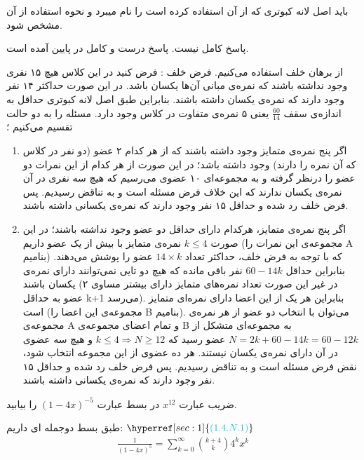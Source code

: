 \documentclass[11pt,largemargins]{h2wp}
\begin{document}
\Nnote
باید اصل لانه   کبوتری که از آن استفاده کرده است را نام میبرد و نحوه استفاده از آن مشخص شود.
\label{sec:2} 

\Tnote
پاسخ کامل نیست. پاسخ درست و کامل در پایین آمده است.
\label{sec:3}



از برهان خلف استفاده می‌کنیم. فرض خلف : فرض کنید در این کلاس هیچ ۱۵ نفری وجود نداشته باشند که نمره‌ی مبانی آن‌ها یکسان باشد.
در این صورت حداکثر ۱۴ نفر وجود دارند که نمره‌ی یکسان داشته باشند. بنابراین  طبق اصل لانه کبوتری حداقل به اندازه‌ی سقف
$\frac{60}{14}$
یعنی ۵ نمره‌ی متفاوت در کلاس وجود دارد. مسئله را به دو حالت تقسیم می‌کنیم ؛
\begin{enumerate}
    \item 
    اگر پنج نمره‌ی متمایز وجود داشته باشند که از هر کدام ۲ عضو
    (دو نفر در کلاس که آن نمره را دارند)
    وجود داشته باشد؛ در این صورت از هر کدام از این نمرات دو عضو را درنظر گرفته و به مجموعه‌ای ۱۰ عضوی
    می‌رسیم که هیچ سه نفری در آن نمره‌ی یکسان ندارند که این خلاف فرض مسئله است و به تناقض رسیدیم.
    پس فرض خلف رد شده و حداقل ۱۵ نفر وجود دارند که نمره‌ی یکسانی داشته باشند.
    
    \item 
    اگر پنج نمره‌ی متمایز، هرکدام دارای حداقل دو عضو وجود نداشته باشند؛
    در این صورت 
    $k \le 4$
    نمره‌ی متمایز با بیش از یک عضو داریم
    (مجموعه‌ی این نمرات را A بنامیم)
    که با توجه به فرض خلف، حداکثر تعداد
    $14 \times k$
    عضو را پوشش می‌دهند. بنابراین حداقل 
    $60 - 14k$
    نفر باقی مانده که هیچ دو تایی نمی‌توانند دارای نمره‌ی یکسان باشند
    (در غیر این صورت تعداد نمره‌های متمایز دارای بیشتر مساوی ۲ عضو به حداقل k+1 می‌رسد).
    بنابراین هر یک از این اعضا دارای نمره‌ای متمایز است
    (مجموعه‌ی این اعضا را B بنامیم).
    می‌توان با انتخاب دو عضو از هر نمره‌ی مجموعه‌ی
    A
    و تمام اعضای مجموعه‌‌ی
    B
    به مجموعه‌ای متشکل از
    $N = 2k + 60 - 14k = 60 - 12k$
    عضو رسید که
    $k \le 4 \Rightarrow N \ge 12$
    و هیچ سه عضوی در آن دارای نمره‌ی یکسان نیستند.
    هر ده عضوی از این مجموعه انتخاب شود، نقض فرض مسئله است و به تناقض رسیدیم.
    پس فرض خلف رد شده و حداقل ۱۵ نفر وجود دارند که نمره‌ی یکسانی داشته باشند.
\end{enumerate}


\question
ضریب عبارت $ x ^ {12}$
در بسط عبارت
$(1-4x)^{-5}$
را بیابید.

\solution
طبق بسط دوجمله ای داریم:  
$ \hyperref[sec:1]{\textcolor{capri}{(1.4.N.1)}}  $     
    \begin{align*}
    \frac{1}{(1-4x)^5}=\sum\limits_{k=0}^{\infty} \binom{k+4}{k}  4 ^ k  x^ k              
    \end{align*}
    
\end{document}
